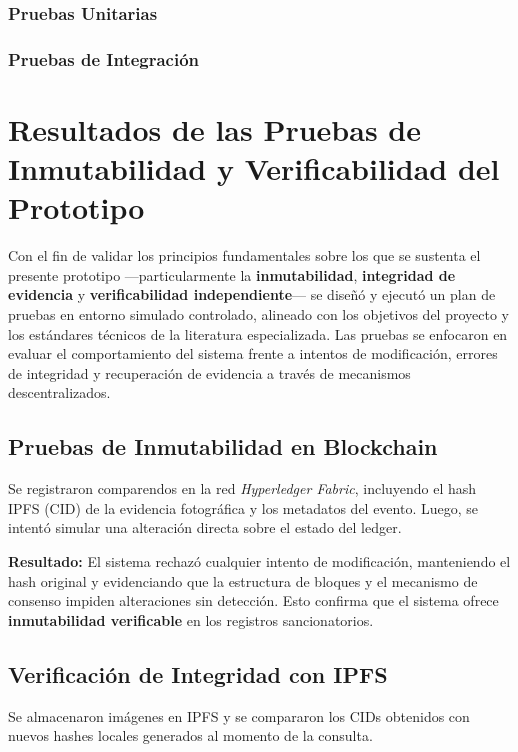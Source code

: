 \subsubsection{Pruebas Unitarias}

\subsubsection{Pruebas de Integración}

\section{Resultados de las Pruebas de Inmutabilidad y Verificabilidad del Prototipo}

Con el fin de validar los principios fundamentales sobre los que se sustenta el presente prototipo —particularmente la \textbf{inmutabilidad}, \textbf{integridad de evidencia} y \textbf{verificabilidad independiente}— se diseñó y ejecutó un plan de pruebas en entorno simulado controlado, alineado con los objetivos del proyecto y los estándares técnicos de la literatura especializada. Las pruebas se enfocaron en evaluar el comportamiento del sistema frente a intentos de modificación, errores de integridad y recuperación de evidencia a través de mecanismos descentralizados.

\subsection{Pruebas de Inmutabilidad en Blockchain}

Se registraron comparendos en la red \textit{Hyperledger Fabric}, incluyendo el hash IPFS (CID) de la evidencia fotográfica y los metadatos del evento. Luego, se intentó simular una alteración directa sobre el estado del ledger.

\textbf{Resultado:} El sistema rechazó cualquier intento de modificación, manteniendo el hash original y evidenciando que la estructura de bloques y el mecanismo de consenso impiden alteraciones sin detección. Esto confirma que el sistema ofrece \textbf{inmutabilidad verificable} en los registros sancionatorios.

\subsection{Verificación de Integridad con IPFS}

Se almacenaron imágenes en IPFS y se compararon los CIDs obtenidos con nuevos hashes locales generados al momento de la consulta.

